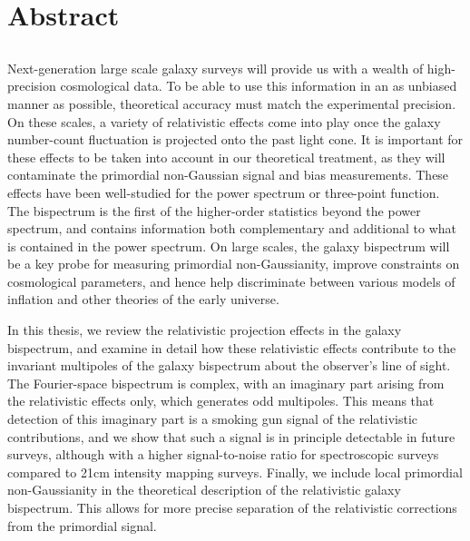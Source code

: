 \chapter*{Abstract}
\label{ch:abstract}
\section*{}
\singlespacing


Next-generation large scale galaxy surveys will provide us with a wealth of high-precision cosmological data. To be able to use this information in an as unbiased manner as possible, theoretical accuracy must match the experimental precision. On these scales, a variety of relativistic effects come into play once the galaxy number-count fluctuation is projected onto the past light cone. It is important for these effects to be taken into account in our theoretical treatment, as they will contaminate the primordial non-Gaussian signal and bias measurements. These effects have been well-studied for the power spectrum or three-point function. The bispectrum is the first of the higher-order statistics beyond the power spectrum, and contains information both complementary and additional to what is contained in the power spectrum. On large scales, the galaxy bispectrum will be a key probe for measuring primordial non-Gaussianity, improve constraints on cosmological parameters, and hence help discriminate between various models of inflation and other theories of the early universe. 

In this thesis, we review the relativistic projection effects in the galaxy bispectrum, and examine in detail how these relativistic effects contribute to the invariant multipoles of the galaxy bispectrum about the observer's line of sight. The Fourier-space bispectrum is complex, with an imaginary part arising from the relativistic effects only, which generates odd multipoles. This means that detection of this imaginary part is a smoking gun signal of the relativistic contributions, and we show that such a signal is in principle detectable in future surveys, although with a higher signal-to-noise ratio for spectroscopic surveys compared to 21cm intensity mapping surveys. Finally, we include local primordial non-Gaussianity in the theoretical description of the relativistic galaxy bispectrum. This allows for more precise separation of the relativistic corrections from the primordial signal.
